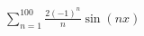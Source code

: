 \documentclass[preview]{standalone}
\begin{document}
\begin{center}
$\sum_{n=1}^{100} \frac{2(-1)^n}{n} \sin(nx)$
\end{center}
\end{document}
